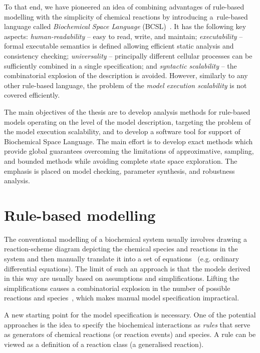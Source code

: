 \documentclass[11pt,a4paper]{report}
\begin{document}
To that end, we have pioneered an idea of combining advantages of rule-based modelling with the simplicity of chemical reactions by introducing a~rule-based language called \emph{Biochemical Space Language} (BCSL)~\cite{dved2016formal}. It has the following key aspects: \emph{human-readability} -- easy to read, write, and maintain;
\emph{executability} -- formal executable semantics is defined allowing efficient static analysis and consistency checking; \emph{universality} -- principally different cellular processes can be sufficiently combined in a single specification; and \emph{syntactic scalability} -- the combinatorial explosion of the description is avoided. However, similarly to any other rule-based language, the problem of the \emph{model execution scalability} is not covered efficiently.

The main objectives of the thesis are to develop analysis methods for rule-based models operating on the level of the model description, targeting the problem of the model execution scalability, and to develop a software tool for support of Biochemical Space Language. The main effort is to develop exact methods which provide global guarantees overcoming the limitations of approximative, sampling, and bounded methods while avoiding complete state space exploration. The emphasis is placed on model checking, parameter synthesis, and robustness analysis.

\chapter{Rule-based modelling}
\label{formal}

The conventional modelling of a biochemical system usually involves drawing a reaction-scheme diagram depicting the chemical species and reactions in the system and then manually translate it into a set of equations~\cite{voit2000computational} (e.g. ordinary differential equations). The limit of such an approach is that the models derived in this way are usually based on assumptions and simplifications. Lifting the simplifications causes a combinatorial explosion in the number of possible reactions and species~\cite{blinov2006network}, which makes manual model specification impractical.

A new starting point for the model specification is necessary. One of the potential approaches is the idea to specify the biochemical interactions as \emph{rules} that serve as generators of chemical reactions (or reaction events) and species. A rule can be viewed as a definition of a reaction class (a generalised reaction).
\end{document}
